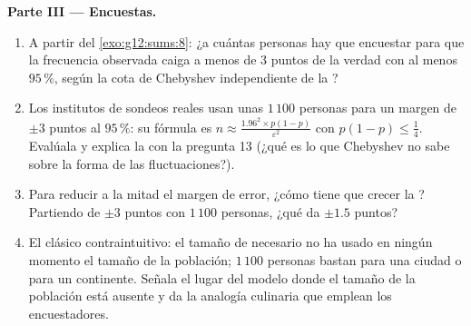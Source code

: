 \begin{problem}
\medskip
\noindent\textbf{Parte III --- Encuestas.}
\begin{enumerate}[resume]
  \item A partir del \cref{exo:g12:sums:8}: ¿a cuántas personas hay que
        encuestar para que la frecuencia observada caiga a menos de $3$
        puntos de la verdad con  al menos $95\,\%$, según la
        cota de Chebyshev independiente de la ?
  \item Los institutos de sondeos reales usan unas $1\,100$ personas para
        un margen de $\pm 3$ puntos al $95\,\%$: su fórmula es
        $n \approx \frac{1.96^2 \times p(1-p)}{\varepsilon^2}$ con
        $p(1-p) \leq \frac14$. Evalúala y explica la  con la
        pregunta 13 (¿qué es lo que Chebyshev no sabe sobre la forma de las
        fluctuaciones?).
  \item Para reducir a la mitad el margen de error, ¿cómo tiene que crecer
        la ? Partiendo de $\pm 3$ puntos con $1\,100$ personas, ¿qué
         da $\pm 1.5$ puntos?
  \item El clásico contraintuitivo: el tamaño de  necesario no ha
        usado en ningún momento el tamaño de la población; $1\,100$
        personas bastan para una ciudad o para un continente. Señala el
        lugar del modelo donde el tamaño de la población está ausente y da
        la analogía culinaria que emplean los encuestadores.
\end{enumerate}


\end{problem}
